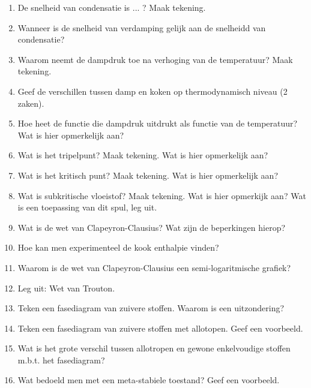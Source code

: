 \documentclass[a4paper,12pt]{article}
\begin{document}
\begin{enumerate}
        \item De snelheid van condensatie is ... ? Maak tekening.
        \item Wanneer is de snelheid van verdamping gelijk aan de snelheidd van condensatie?
        \item Waarom neemt de dampdruk toe na verhoging van de temperatuur? Maak tekening.
        \item Geef de verschillen tussen damp en koken op thermodynamisch niveau (2 zaken).
        \item Hoe heet de functie die dampdruk uitdrukt als functie van de temperatuur? Wat is hier opmerkelijk aan?
        \item Wat is het tripelpunt? Maak tekening. Wat is hier opmerkelijk aan?
        \item Wat is het kritisch punt? Maak tekening. Wat is hier opmerkelijk aan?
        \item Wat is subkritische vloeistof? Maak tekening. Wat is hier opmerkijk aan? Wat is een toepassing van dit spul, leg uit.
        \item Wat is de wet van Clapeyron-Clausius? Wat zijn de beperkingen hierop? 
        \item Hoe kan men experimenteel de kook enthalpie vinden?
        \item Waarom is de wet van Clapeyron-Clausius een semi-logaritmische grafiek?
        \item Leg uit: Wet van Trouton.
        \item Teken een fasediagram van zuivere stoffen. Waarom is  een uitzondering?
        \item Teken een fasediagram van zuivere stoffen met allotopen. Geef een voorbeeld.
        \item Wat is het grote verschil tussen allotropen en gewone enkelvoudige stoffen m.b.t. het fasediagram?
        \item Wat bedoeld men met een meta-stabiele toestand? Geef een voorbeeld.
    \end{enumerate}
\end{document}
